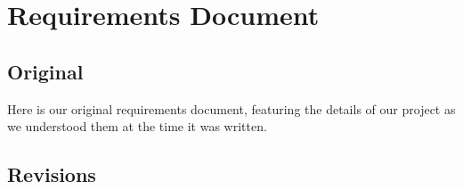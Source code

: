 \documentclass[12pt]{article}
\begin{document}
\section{Requirements Document}
\subsection{Original}
Here is our original requirements document, featuring the details of our project as we understood them at the time it was written.


\subsection{Revisions}
\end{document}
